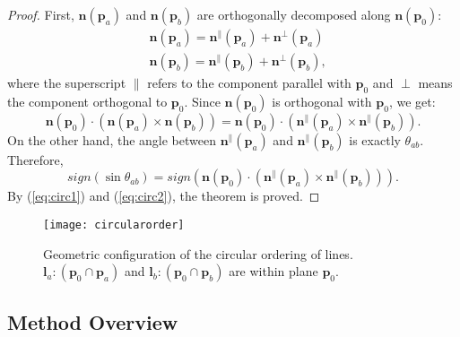 \begin{proof}
 First, $\bm{n}(\bm{p}_a)$ and $\bm{n}(\bm{p}_b)$ are orthogonally decomposed along $\bm{n}(\bm{p}_0)$:
 \begin{equation}
 \begin{split}
   &\bm{n}(\bm{p}_a)= \bm{n}^\parallel(\bm{p}_a) + \bm{n}^\perp(\bm{p}_a)\\
   &\bm{n}(\bm{p}_b)= \bm{n}^\parallel(\bm{p}_b) + \bm{n}^\perp(\bm{p}_b),
 \end{split}
 \end{equation}
 where the superscript $\parallel$ refers to the component parallel with $\bm{p}_0$ and $\perp$ means the component orthogonal to $\bm{p}_0$. Since $\bm{n}(\bm{p}_0)$ is orthogonal with $\bm{p}_0$, we get:
 \begin{equation}
   \label{eq:circ1}
   \bm{n}(\bm{p}_0) \cdot (\bm{n}(\bm{p}_a) \times \bm{n}(\bm{p}_b)) = \bm{n}(\bm{p}_0) \cdot (\bm{n}^\parallel(\bm{p}_a) \times \bm{n}^\parallel(\bm{p}_b)).
 \end{equation}
 On the other hand, the angle between $\bm{n}^\parallel(\bm{p}_a)$ and $\bm{n}^\parallel(\bm{p}_b)$ is exactly $\theta_{ab}$. Therefore,
 \begin{equation}
   \label{eq:circ2}
   sign(\sin{\theta_{ab}})=  sign(\bm{n}(\bm{p}_0) \cdot (\bm{n}^\parallel(\bm{p}_a) \times \bm{n}^\parallel(\bm{p}_b))).
 \end{equation}
 By (\ref{eq:circ1}) and (\ref{eq:circ2}), the theorem is proved.
\end{proof}

\begin{figure}[t]
\centering
\texttt{[image: circularorder]}
\caption{Geometric configuration of the circular ordering of lines. $\bm{l}_a\colon(\bm{p}_0 \cap \bm{p}_a)$ and $\bm{l}_b\colon(\bm{p}_0 \cap \bm{p}_b)$ are within plane $\bm{p}_0$.}
\label{fig:circularorder}
\end{figure}

\subsection{Method Overview}



